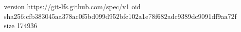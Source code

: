 version https://git-lfs.github.com/spec/v1
oid sha256:cfb383045aa378ac0f5bd099d952bfc102a1e78f682adc9389dc9091df9aa72f
size 174936
